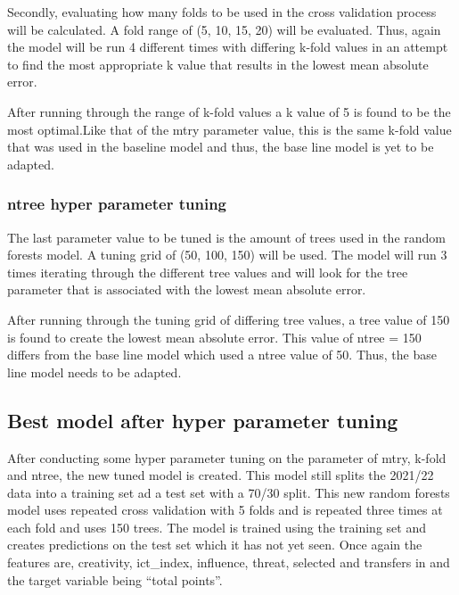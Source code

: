 \documentclass[11pt,preprint, authoryear]{elsarticle}
\numberwithin{equation}{section}
\numberwithin{figure}{section}
\numberwithin{table}{section}
\begin{document}
Secondly, evaluating how many folds to be used in the cross validation
process will be calculated. A fold range of (5, 10, 15, 20) will be
evaluated. Thus, again the model will be run 4 different times with
differing k-fold values in an attempt to find the most appropriate k
value that results in the lowest mean absolute error.

After running through the range of k-fold values a k value of 5 is found
to be the most optimal.Like that of the mtry parameter value, this is
the same k-fold value that was used in the baseline model and thus, the
base line model is yet to be adapted.

\hypertarget{ntree-hyper-parameter-tuning}{%
\subsubsection{ntree hyper parameter
tuning}\label{ntree-hyper-parameter-tuning}}

The last parameter value to be tuned is the amount of trees used in the
random forests model. A tuning grid of (50, 100, 150) will be used. The
model will run 3 times iterating through the different tree values and
will look for the tree parameter that is associated with the lowest mean
absolute error.

After running through the tuning grid of differing tree values, a tree
value of 150 is found to create the lowest mean absolute error. This
value of ntree = 150 differs from the base line model which used a ntree
value of 50. Thus, the base line model needs to be adapted.

\hypertarget{best-model-after-hyper-parameter-tuning}{%
\subsection{Best model after hyper parameter
tuning}\label{best-model-after-hyper-parameter-tuning}}

After conducting some hyper parameter tuning on the parameter of mtry,
k-fold and ntree, the new tuned model is created. This model still
splits the 2021/22 data into a training set ad a test set with a 70/30
split. This new random forests model uses repeated cross validation with
5 folds and is repeated three times at each fold and uses 150 trees. The
model is trained using the training set and creates predictions on the
test set which it has not yet seen. Once again the features are,
creativity, ict\_index, influence, threat, selected and transfers in and
the target variable being ``total points''.
\end{document}
